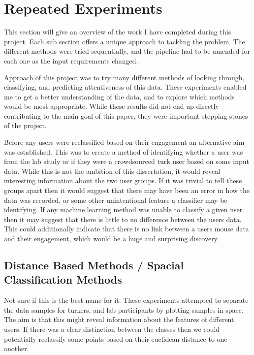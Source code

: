 \documentclass{article}
\begin{document}
\section{Repeated Experiments}

This section will give an overview of the work I have completed during this project.
Each sub section offers a unique approach to tackling the problem.
The different methods were tried sequentially, and the pipeline had to be amended for each one as the input requirements changed.

Approach of this project was to try many different methods of looking through, classifying, and predicting attentiveness of this data.
These experiments enabled me to get a better understanding of the data, and to explore which methods would be most appropriate.
While these results did not end up directly contributing to the main goal of this paper, they were important stepping stones of the project.

Before any users were reclassified based on their engagement an alternative aim was established.
This was to create a method of identifying whether a user was from the lab study or if they were a crowdsourced turk user based on some input data.
While this is not the ambition of this dissertation, it would reveal interesting information about the two user groups.
If it was trivial to tell these groups apart then it would suggest that there may have been an error in how the data was recorded, or some other unintentional feature a classifier may be identifying.
If any machine learning method was unable to classify a given user then it may suggest that there is little to no difference between the users data.
This could additionally indicate that there is no link between a users mouse data and their engagement, which would be a huge and surprising discovery. 


\subsection{Distance Based Methods / Spacial Classification Methods}

Not sure if this is the best name for it.
These experiments attempted to separate the data samples for turkers, and lab participants by plotting samples in space.
The aim is that this might reveal information about the features of different users.
If there was a clear distinction between the classes then we could potentially reclassify some points based on their euclidean distance to one another.
\end{document}
